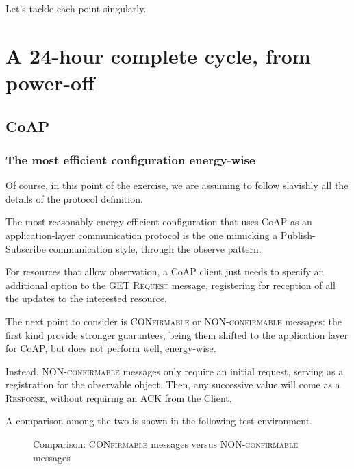 \documentclass[a4paper,11pt]{article} %
\begin{document}
    \medskip

    Let's tackle each point singularly.


    \section{A 24-hour complete cycle, from power-off}\label{sec:a-24-hour-complete-cycle-from-power-off}

    \subsection{CoAP}\label{subsec:coap}

    \subsubsection{The most efficient configuration energy-wise}

    Of course, in this point of the exercise, we are assuming to follow slavishly all the details of the protocol definition.

    The most reasonably energy-efficient configuration that uses CoAP as an application-layer communication protocol is the one mimicking a Publish-Subscribe communication style, through the observe pattern.

    For resources that allow observation, a CoAP client just needs to specify an additional option to the \textsc{GET Request} message, registering for reception of all the updates to the interested resource.

    The next point to consider is \textsc{CONfirmable} or \textsc{NON-confirmable} messages: the first kind provide stronger guarantees, being them shifted to the application layer for CoAP, but does not perform well, energy-wise.

    Instead, \textsc{NON-confirmable} messages only require an initial request, serving as a registration for the observable object.
    Then, any successive value will come as a \textsc{Response}, without requiring an \textsc{ACK} from the Client.

    A comparison among the two is shown in the following test environment.

    \begin{figure}[H]
        \centering
        \qquad
        \caption{Comparison: \textsc{CONfirmable} messages versus \textsc{NON-confirmable} messages}
        \label{fig:comparison-coap}
    \end{figure}
\end{document}
